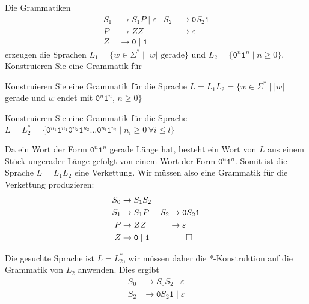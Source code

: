 Die Grammatiken
\begin{align*}
S_1 & \to S_1P \;|\; \varepsilon    & S_2 & \to \texttt{0}S_2\texttt{1}    \\
P   & \to ZZ                        &     & \to \varepsilon                \\
Z   & \to \texttt{0}\mid\texttt{1}  &     &                               
\end{align*}
erzeugen die Sprachen $L_1=\{w\in\Sigma^*\mid  \text{$|w|$ gerade}\}$
und $L_2=\{\texttt{0}^n\texttt{1}^n \mid n\ge 0\}$.
Konstruieren Sie eine Grammatik für
\begin{teilaufgaben}
\item Konstruieren Sie eine Grammatik für die Sprache $L=L_1L_2=\{
w\in\Sigma^* \mid
|w|$ gerade und $w$ endet mit $\texttt{0}^n\texttt{1}^n$, $n\ge 0 \}$
\item Konstruieren Sie eine Grammatik für die Sprache $L=L_2^*=\{
\texttt{0}^{n_1}\texttt{1}^{n_1}
\texttt{0}^{n_2}\texttt{1}^{n_2}
\dots
\texttt{0}^{n_l}\texttt{1}^{n_l}
\mid
n_i\ge 0\,\forall i\le l
\}$
\end{teilaufgaben}


\begin{loesung}
\begin{teilaufgaben}
\item
Da ein Wort der Form $\texttt{0}^n\texttt{1}^n$ gerade Länge hat, besteht
ein Wort von $L$ aus einem Stück ungerader Länge gefolgt von einem
Wort der Form $\texttt{0}^n\texttt{1}^n$.
Somit ist die Sprache $L=L_1L_2$ eine Verkettung.
Wir müssen also eine Grammatik für die Verkettung produzieren:
\begin{align*}
S_0 & \to S_1S_2                    &     &                                \\
S_1 & \to S_1P                      & S_2 & \to \texttt{0}S_2\texttt{1}    \\
P   & \to ZZ                        &     & \to \varepsilon                \\
Z   & \to \texttt{0}\mid\texttt{1}  &     &                               
\qedhere
\end{align*}
\item
Die gesuchte Sprache ist $L=L_2^*$, wir müssen daher die *-Konstruktion
auf die Grammatik von $L_2$ anwenden.
Dies ergibt 
\begin{align*}
S_0 & \to S_0S_2 \mid \varepsilon  \\
S_2 & \to \texttt{0}S_2\texttt{1} \mid \varepsilon
\end{align*}
\end{teilaufgaben}
\end{loesung}




